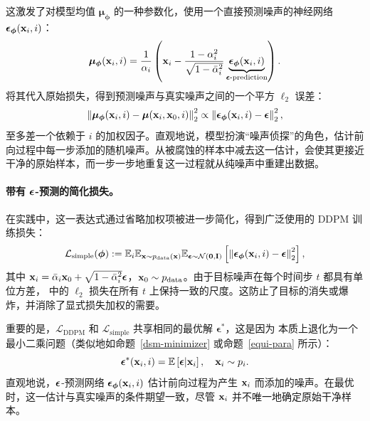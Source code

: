 这激发了对模型均值 $\bm{\mu}_{\bm{\phi}}$ 的一种参数化，使用一个直接预测噪声的神经网络 $\boldsymbol{\epsilon}_{\bm{\phi}}({\mathbf{x}}_i, i)$：
\[
\bm{\mu}_{\bm{\phi}}({\mathbf{x}}_i, i) = \frac{1}{\alpha_i} \left( {\mathbf{x}}_i - \frac{1 - \alpha_i^2}{\sqrt{1 - \bar{\alpha}_i^2}} \underbrace{\boldsymbol{\epsilon}_{\bm{\phi}}({\mathbf{x}}_i, i)}_{{\bm{\epsilon}}\text{-prediction}} \right).
\]
将其代入原始损失，得到预测噪声与真实噪声之间的一个平方 $\ell_2$ 误差：
\[
\left\| \bm{\mu}_{\bm{\phi}}({\mathbf{x}}_i, i) - \bm{\mu}({\mathbf{x}}_i, {\mathbf{x}}_0, i) \right\|_2^2 \propto \left\| \boldsymbol{\epsilon}_{\bm{\phi}}({\mathbf{x}}_i, i) - \boldsymbol{\epsilon} \right\|_2^2,
\]
至多差一个依赖于 $i$ 的加权因子。直观地说，模型扮演“噪声侦探”的角色，估计前向过程中每一步添加的随机噪声。从被腐蚀的样本中减去这一估计，会使其更接近干净的原始样本，而一步一步地重复这一过程就从纯噪声中重建出数据。

\paragraph{带有 ${\bm{\epsilon}}$-预测的简化损失。}
在实践中，这一表达式通过省略加权项被进一步简化，得到广泛使用的 DDPM 训练损失：
\begin{equation}\label{eq:ddpm-simple-loss}
    \mathcal{L}_{\text{simple}}(\bm{\phi}) := \mathbb{E}_{i} \mathbb{E}_{{\mathbf{x}} \sim p_{\text{data}}({\mathbf{x}})} \mathbb{E}_{\boldsymbol{\epsilon} \sim \mathcal{N}(\mathbf{0}, \mathbf{I})} \left[ \left\| \boldsymbol{\epsilon}_{\bm{\phi}}({\mathbf{x}}_i, i) - \boldsymbol{\epsilon} \right\|_2^2 \right],
\end{equation}
其中 ${\mathbf{x}}_i = \bar{\alpha}_i {\mathbf{x}}_0 + \sqrt{1 - \bar{\alpha}_i^2} \boldsymbol{\epsilon}$，${\mathbf{x}}_0 \sim p_{\text{data}}$。由于目标噪声在每个时间步 $t$ 都具有单位方差， 中的 $\ell_2$ 损失在所有 $t$ 上保持一致的尺度。这防止了目标的消失或爆炸，并消除了显式损失加权的需要。


重要的是，$\mathcal{L}_{\text{DDPM}}$ 和 $\mathcal{L}_{\text{simple}}$ 共享相同的最优解 $\boldsymbol{\epsilon}^*$，这是因为  本质上退化为一个最小二乘问题（类似地如命题~\ref{dsm-minimizer} 或命题~\ref{equi-para} 所示）：
\[
\boldsymbol{\epsilon}^*({\mathbf{x}}_i, i) = \mathbb{E}\left[ \boldsymbol{\epsilon}|{\mathbf{x}}_i \right], \quad {\mathbf{x}}_i \sim p_i.
\]
直观地说，${\bm{\epsilon}}$-预测网络 $\boldsymbol{\epsilon}_{\bm{\phi}}({\mathbf{x}}_i, i)$ 估计前向过程为产生 ${\mathbf{x}}_i$ 而添加的噪声。在最优时，这一估计与真实噪声的条件期望一致，尽管 ${\mathbf{x}}_i$ 并不唯一地确定原始干净样本。

